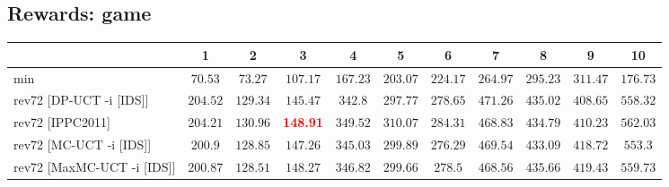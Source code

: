 \documentclass{article}
\begin{document}
\bigskip

\subsection*{Rewards: game}

\begin{tabular}{|l|r@{$\pm$}rr@{$\pm$}rr@{$\pm$}rr@{$\pm$}rr@{$\pm$}rr@{$\pm$}rr@{$\pm$}rr@{$\pm$}rr@{$\pm$}rr@{$\pm$}r|}
\hline

& \multicolumn{2}{c}{1}
& \multicolumn{2}{c}{2}
& \multicolumn{2}{c}{3}
& \multicolumn{2}{c}{4}
& \multicolumn{2}{c}{5}
& \multicolumn{2}{c}{6}
& \multicolumn{2}{c}{7}
& \multicolumn{2}{c}{8}
& \multicolumn{2}{c}{9}
& \multicolumn{2}{c|}{10}
\\
\hline
\hline
min
& \multicolumn{2}{c}{$70.53$}
& \multicolumn{2}{c}{$73.27$}
& \multicolumn{2}{c}{$107.17$}
& \multicolumn{2}{c}{$167.23$}
& \multicolumn{2}{c}{$203.07$}
& \multicolumn{2}{c}{$224.17$}
& \multicolumn{2}{c}{$264.97$}
& \multicolumn{2}{c}{$295.23$}
& \multicolumn{2}{c}{$311.47$}
& \multicolumn{2}{c|}{$176.73$}
\\
rev72 [DP-UCT -i [IDS]]
& \multicolumn{2}{c}{$204.52$}
& \multicolumn{2}{c}{$129.34$}
& \multicolumn{2}{c}{$145.47$}
& \multicolumn{2}{c}{$342.8$}
& \multicolumn{2}{c}{$297.77$}
& \multicolumn{2}{c}{$278.65$}
& \multicolumn{2}{c}{$471.26$}
& \multicolumn{2}{c}{$435.02$}
& \multicolumn{2}{c}{$408.65$}
& \multicolumn{2}{c|}{$558.32$}
\\
rev72 [IPPC2011]
& \multicolumn{2}{c}{$204.21$}
& \multicolumn{2}{c}{$130.96$}
& \multicolumn{2}{c}{\textbf{\textcolor{red}{148.91}}}
& \multicolumn{2}{c}{$349.52$}
& \multicolumn{2}{c}{$310.07$}
& \multicolumn{2}{c}{$284.31$}
& \multicolumn{2}{c}{$468.83$}
& \multicolumn{2}{c}{$434.79$}
& \multicolumn{2}{c}{$410.23$}
& \multicolumn{2}{c|}{$562.03$}
\\
rev72 [MC-UCT -i [IDS]]
& \multicolumn{2}{c}{$200.9$}
& \multicolumn{2}{c}{$128.85$}
& \multicolumn{2}{c}{$147.26$}
& \multicolumn{2}{c}{$345.03$}
& \multicolumn{2}{c}{$299.89$}
& \multicolumn{2}{c}{$276.29$}
& \multicolumn{2}{c}{$469.54$}
& \multicolumn{2}{c}{$433.09$}
& \multicolumn{2}{c}{$418.72$}
& \multicolumn{2}{c|}{$553.3$}
\\
rev72 [MaxMC-UCT -i [IDS]]
& \multicolumn{2}{c}{$200.87$}
& \multicolumn{2}{c}{$128.51$}
& \multicolumn{2}{c}{$148.27$}
& \multicolumn{2}{c}{$346.82$}
& \multicolumn{2}{c}{$299.66$}
& \multicolumn{2}{c}{$278.5$}
& \multicolumn{2}{c}{$468.56$}
& \multicolumn{2}{c}{$435.66$}
& \multicolumn{2}{c}{$419.43$}
& \multicolumn{2}{c|}{$559.73$}

\end{tabular}
\end{document}
